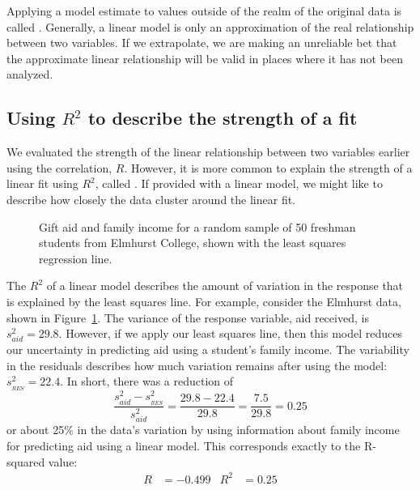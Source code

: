 Applying a model estimate to values outside of the realm of the original data is called . Generally, a linear model is only an approximation of the real relationship between two variables. If we extrapolate, we are making an unreliable bet that the approximate linear relationship will be valid in places where it has not been analyzed.


\subsection{Using $R^2$ to describe the strength of a fit}


We evaluated the strength of the linear relationship between two variables earlier using the correlation, $R$. However, it is more common to explain the strength of a linear fit using $R^2$, called . If provided with a linear model, we might like to describe how closely the data cluster around the linear fit.

\begin{figure}
  \centering
  \caption{Gift aid and family income for a random sample
      of 50 freshman students from Elmhurst College, shown
      with the least squares regression line.}
  \label{elmhurstScatterWLSROnly}
\end{figure}

The $R^2$ of a linear model describes the amount of variation in the response that is explained by the least squares line. For example, consider the Elmhurst data, shown in Figure~\ref{elmhurstScatterWLSROnly}. The variance of the response variable, aid received, is $s_{aid}^2=29.8$. However, if we apply our least squares line, then this model reduces our uncertainty in predicting aid using a student's family income. The variability in the residuals describes how much variation remains after using the model: $s_{_{RES}}^2 = 22.4$. In short, there was a reduction of
$$\frac{s_{aid}^2 - s_{_{RES}}^2}{s_{aid}^2}
	= \frac{29.8 - 22.4}{29.8} = \frac{7.5}{29.8}
	= 0.25$$
or about  25\% in the data's variation by using information about family income for predicting aid using a linear model. This corresponds exactly to the R-squared value:
\begin{align*}
R &= -0.499 &R^2 &= 0.25
\end{align*}

